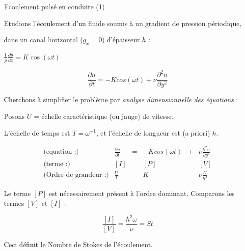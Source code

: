  
 \begin{frame}{ Ecoulement pulsé en conduite (1) }

\small

Etudions l'écoulement  d'un fluide soumis à un gradient de pression périodique,

 dans un canal horizontal ($g_x = 0$) d'épaisseur $h$ :
 
 
$ \frac{1}{\rho} \frac{\partial p }{\partial x} = K \cos (\omega t)$

$$ 
\frac{\partial u}{\partial t} = - K cos(\omega t) + \nu \frac{\partial^2 u}{\partial y^2 }
$$

\pause 
\smallskip
Cherchons à simplifier le problème par {\em analyse dimensionnelle des équations} :

Posons $U$ = échelle  caractéristique (ou jauge)  de vitesse. 

L'échelle de temps est $T = \omega^{-1}$, et l'échelle de longueur est (a priori) $h$.


$$ 
\begin{array}{lccccc} 
\mbox{(equation :)} &
\frac{\partial u}{\partial t}  &= & - K cos(\omega t) &+ & \nu \frac{\partial^2 u}{\partial y^2} \\
\mbox{(terme :)} &
\left[I\right] && \left[P\right] &&\left[V\right] \\
\mbox{(Ordre de grandeur :)} &
\frac{U}{T}  && K && \nu \frac{U}{h^2}
\end{array}
$$

Le terme $[P]$ est nécessairement présent à l'ordre dominant. Comparons les termes  $[V] $ et $[I]$ :

$$ 
\frac{[I]}{[V]} =  \frac{h^2 \omega}{\nu} = St 
$$

Ceci définit le Nombre de Stokes de l'écoulement. 

\end{frame}

